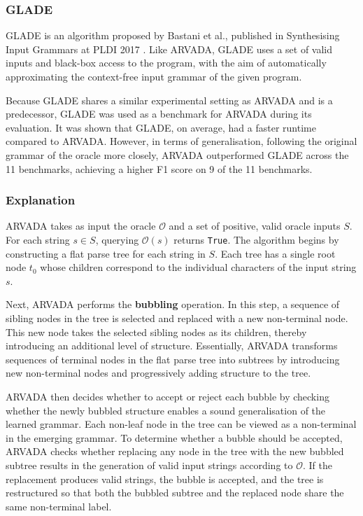 \subsubsection{GLADE}
GLADE is an algorithm proposed by Bastani et al., published in Synthesising Input Grammars at PLDI 2017 \cite{bastaniSynthesizingProgramInput}. Like ARVADA, GLADE uses a set of valid inputs and black-box access to the program, with the aim of automatically approximating the context-free input grammar of the given program.

\vspace{\baselineskip}

Because GLADE shares a similar experimental setting as ARVADA and is a predecessor, GLADE was used as a benchmark for ARVADA during its evaluation. It was shown that GLADE, on average, had a faster runtime compared to ARVADA. However, in terms of generalisation, following the original grammar of the oracle more closely, ARVADA outperformed GLADE across the 11 benchmarks, achieving a higher F1 score on 9 of the 11 benchmarks.

\subsubsection{Explanation}

ARVADA takes as input the oracle $\mathcal{O}$ and a set of positive, valid oracle inputs $S$. For each string $s \in S$, querying $\mathcal{O}(s)$ returns \verb|True|. The algorithm begins by constructing a flat parse tree for each string in $S$. Each tree has a single root node $t_0$ whose children correspond to the individual characters of the input string $s$.

\vspace{\baselineskip}
Next, ARVADA performs the \textbf{bubbling} operation. In this step, a sequence of sibling nodes in the tree is selected and replaced with a new non-terminal node. This new node takes the selected sibling nodes as its children, thereby introducing an additional level of structure. Essentially, ARVADA transforms sequences of terminal nodes in the flat parse tree into subtrees by introducing new non-terminal nodes and progressively adding structure to the tree.

\vspace{\baselineskip}
ARVADA then decides whether to accept or reject each bubble by checking whether the newly bubbled structure enables a sound generalisation of the learned grammar. Each non-leaf node in the tree can be viewed as a non-terminal in the emerging grammar. To determine whether a bubble should be accepted, ARVADA checks whether replacing any node in the tree with the new bubbled subtree results in the generation of valid input strings according to $\mathcal{O}$. If the replacement produces valid strings, the bubble is accepted, and the tree is restructured so that both the bubbled subtree and the replaced node share the same non-terminal label.

